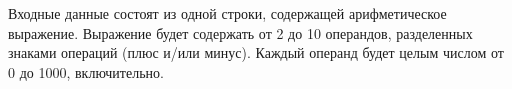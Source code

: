 Входные данные состоят из одной строки, содержащей арифметическое выражение. Выражение будет содержать от 2 до 10 операндов, разделенных знаками операций (плюс и/или минус). Каждый операнд будет целым числом от 0 до 1000, включительно.